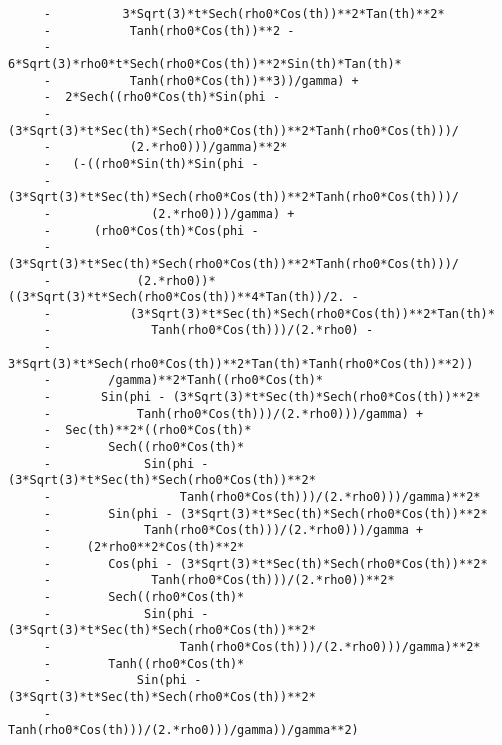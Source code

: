 \begin{verbatim}
     -          3*Sqrt(3)*t*Sech(rho0*Cos(th))**2*Tan(th)**2*
     -           Tanh(rho0*Cos(th))**2 - 
     -          6*Sqrt(3)*rho0*t*Sech(rho0*Cos(th))**2*Sin(th)*Tan(th)*
     -           Tanh(rho0*Cos(th))**3))/gamma) + 
     -  2*Sech((rho0*Cos(th)*Sin(phi - 
     -          (3*Sqrt(3)*t*Sec(th)*Sech(rho0*Cos(th))**2*Tanh(rho0*Cos(th)))/
     -           (2.*rho0)))/gamma)**2*
     -   (-((rho0*Sin(th)*Sin(phi - 
     -             (3*Sqrt(3)*t*Sec(th)*Sech(rho0*Cos(th))**2*Tanh(rho0*Cos(th)))/
     -              (2.*rho0)))/gamma) + 
     -      (rho0*Cos(th)*Cos(phi - 
     -           (3*Sqrt(3)*t*Sec(th)*Sech(rho0*Cos(th))**2*Tanh(rho0*Cos(th)))/
     -            (2.*rho0))*((3*Sqrt(3)*t*Sech(rho0*Cos(th))**4*Tan(th))/2. - 
     -           (3*Sqrt(3)*t*Sec(th)*Sech(rho0*Cos(th))**2*Tan(th)*
     -              Tanh(rho0*Cos(th)))/(2.*rho0) - 
     -           3*Sqrt(3)*t*Sech(rho0*Cos(th))**2*Tan(th)*Tanh(rho0*Cos(th))**2))
     -        /gamma)**2*Tanh((rho0*Cos(th)*
     -       Sin(phi - (3*Sqrt(3)*t*Sec(th)*Sech(rho0*Cos(th))**2*
     -            Tanh(rho0*Cos(th)))/(2.*rho0)))/gamma) + 
     -  Sec(th)**2*((rho0*Cos(th)*
     -        Sech((rho0*Cos(th)*
     -             Sin(phi - (3*Sqrt(3)*t*Sec(th)*Sech(rho0*Cos(th))**2*
     -                  Tanh(rho0*Cos(th)))/(2.*rho0)))/gamma)**2*
     -        Sin(phi - (3*Sqrt(3)*t*Sec(th)*Sech(rho0*Cos(th))**2*
     -             Tanh(rho0*Cos(th)))/(2.*rho0)))/gamma + 
     -     (2*rho0**2*Cos(th)**2*
     -        Cos(phi - (3*Sqrt(3)*t*Sec(th)*Sech(rho0*Cos(th))**2*
     -              Tanh(rho0*Cos(th)))/(2.*rho0))**2*
     -        Sech((rho0*Cos(th)*
     -             Sin(phi - (3*Sqrt(3)*t*Sec(th)*Sech(rho0*Cos(th))**2*
     -                  Tanh(rho0*Cos(th)))/(2.*rho0)))/gamma)**2*
     -        Tanh((rho0*Cos(th)*
     -            Sin(phi - (3*Sqrt(3)*t*Sec(th)*Sech(rho0*Cos(th))**2*
     -                 Tanh(rho0*Cos(th)))/(2.*rho0)))/gamma))/gamma**2)
     \end{verbatim}